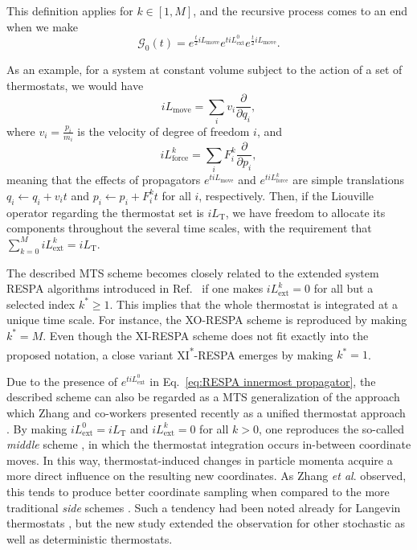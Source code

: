 \documentclass[
    journal=jctcce,
    layout=twocolumn
]{achemso}
\newcommand{\diff}[2]{\frac{\partial #2}{\partial #1}} %
\newcommand{\dof}{i}   %
\newcommand{\Liu}{i\!L}
\begin{document}
This definition applies for $k \in [1, M]$, and the recursive process comes to an end when we make
\begin{equation}
\label{eq:RESPA innermost propagator}
\mathcal{G}_0(t) = e^{\frac{t}{2} \Liu_\mathrm{move}}
e^{t \Liu_\mathrm{ext}^0}
e^{\frac{t}{2} \Liu_\mathrm{move}}.
\end{equation}

As an example, for a system at constant volume subject to the action of a set of thermostats, we would have
\begin{equation}
\Liu_\mathrm{move} = \sum_\dof v_\dof \diff{q_\dof}{},
\end{equation}
where $v_\dof = \frac{p_\dof}{m_\dof}$ is the velocity of degree of freedom $\dof$, and
\begin{equation}
\Liu_\mathrm{force}^k = \sum_\dof F_\dof^k \diff{p_\dof}{},
\end{equation}
meaning that the effects of propagators $e^{t \Liu_\mathrm{move}}$ and $e^{t \Liu_\mathrm{force}^k}$ are simple translations $q_\dof \leftarrow q_\dof + v_\dof t$ and $p_\dof \leftarrow p_\dof + F_\dof^k t$ for all $\dof$, respectively.
Then, if the Liouville operator regarding the thermostat set is $\Liu_\mathrm{T}$, we have freedom to allocate its components throughout the several time scales, with the requirement that $\sum_{k=0}^M \Liu_\mathrm{ext}^k = \Liu_\mathrm{T}$.

The described MTS scheme becomes closely related to the extended system RESPA algorithms introduced in Ref.~ if one makes $\Liu_\mathrm{ext}^k = 0$ for all but a selected index $k^\ast \geq 1$.
This implies that the whole thermostat is integrated at a unique time scale.
For instance, the XO-RESPA scheme \cite{Martyna_1996, Leimkuhler_2013} is reproduced by making $k^\ast = M$.
Even though the XI-RESPA scheme \cite{Martyna_1996, Leimkuhler_2013} does not fit exactly into the proposed notation, a close variant XI\textsuperscript{*}-RESPA emerges by making $k^\ast = 1$.

Due to the presence of $e^{t \Liu_\mathrm{ext}^0}$ in Eq.~\eqref{eq:RESPA innermost propagator}, the described scheme can also be regarded as a MTS generalization of the approach which Zhang and co-workers presented recently as a unified thermostat approach \cite{Zhang_2017}.
By making $\Liu_\mathrm{ext}^0 = \Liu_\mathrm{T}$ and $\Liu_\mathrm{ext}^k = 0$ for all $k > 0$, one reproduces the so-called \textit{middle} scheme \cite{Zhang_2017}, in which the thermostat integration occurs in-between coordinate moves.
In this way, thermostat-induced changes in particle momenta acquire a more direct influence on the resulting new coordinates.
As  Zhang \textit{et al}. \cite{Zhang_2017} observed, this tends to produce better coordinate sampling when compared to the more traditional \textit{side} schemes \cite{Zhang_2017}.
Such a tendency had been noted already for Langevin thermostats \cite{Leimkuhler_2012, Leimkuhler_2013_2}, but the new study extended the observation for other stochastic as well as deterministic thermostats.
\end{document}
